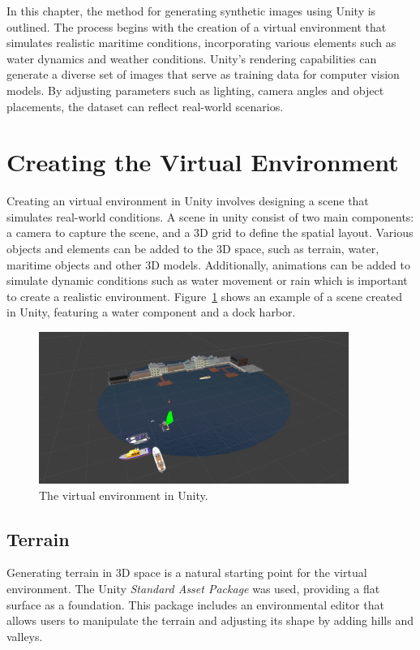 
In this chapter, the method for generating synthetic images using Unity is outlined. The process begins with the creation of a virtual environment that simulates realistic maritime conditions, incorporating various elements such as water dynamics and weather conditions. Unity's rendering capabilities can generate a diverse set of images that serve as training data for computer vision models. By adjusting parameters such as lighting, camera angles and object placements, the dataset can reflect real-world scenarios. 


\section{Creating the Virtual Environment}
Creating an virtual environment in Unity involves designing a scene that simulates real-world conditions. A scene in unity consist of two main components: a camera to capture the scene, and a 3D grid to define the spatial layout. Various objects and elements can be added to the 3D space, such as terrain, water, maritime objects and other 3D models. Additionally, animations can be added to simulate dynamic conditions such as water movement or rain which is important to create a realistic environment. Figure~\ref{fig:environment} shows an example of a scene created in Unity, featuring a water component and a dock harbor.

\begin{figure}[H]
    \centering
    \includegraphics[width=0.9\textwidth]{Figures/method/environment2.png}
    \caption{The virtual environment in Unity.}
    \label{fig:environment}
    
\end{figure}
 
\subsection{Terrain}
Generating terrain in 3D space is a natural starting point for the virtual environment. The Unity \textit{Standard Asset Package} \cite{unity_standard_assets_installation} was used, providing a flat surface as a foundation. This package includes an environmental editor that allows users to manipulate the terrain and adjusting its shape by adding hills and valleys.

